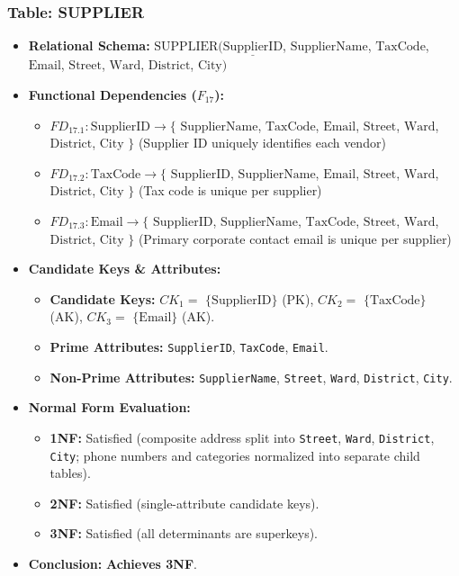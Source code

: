 \documentclass[a4paper,12pt]{report}
\begin{document}
\subsubsection{Table: SUPPLIER}\label{table-supplier}

\begin{itemize}
\item
  \textbf{Relational Schema:} \(\text{SUPPLIER}(\underline{\text{SupplierID}}\), \(\text{SupplierName}\), \(\text{TaxCode}\), \(\text{Email}\), \(\text{Street}\), \(\text{Ward}\), \(\text{District}\), \(\text{City})\)
\item
  \textbf{Functional Dependencies (\(F_{17}\)):}

  \begin{itemize}
  \item
    \(FD_{17.1}: \text{SupplierID} \rightarrow \{\) \(\text{SupplierName}\), \(\text{TaxCode}\), \(\text{Email}\), \(\text{Street}\), \(\text{Ward}\), \(\text{District}\), \(\text{City}\) \(\}\) (Supplier ID uniquely identifies each vendor)
  \item
    \(FD_{17.2}: \text{TaxCode} \rightarrow \{\) \(\text{SupplierID}\), \(\text{SupplierName}\), \(\text{Email}\), \(\text{Street}\), \(\text{Ward}\), \(\text{District}\), \(\text{City}\) \(\}\) (Tax code is unique per supplier)
  \item
    \(FD_{17.3}: \text{Email} \rightarrow \{\) \(\text{SupplierID}\), \(\text{SupplierName}\), \(\text{TaxCode}\), \(\text{Street}\), \(\text{Ward}\), \(\text{District}\), \(\text{City}\) \(\}\) (Primary corporate contact email is unique per supplier)
  \end{itemize}
\item
  \textbf{Candidate Keys \& Attributes:}

  \begin{itemize}
  \item
    \textbf{Candidate Keys:} \(CK_{1} =\) \(\{\text{SupplierID}\}\) (PK), \(CK_{2} =\) \(\{\text{TaxCode}\}\) (AK), \(CK_{3} =\) \(\{\text{Email}\}\) (AK).
  \item
    \textbf{Prime Attributes:} \texttt{SupplierID}, \texttt{TaxCode}, \texttt{Email}.
  \item
    \textbf{Non-Prime Attributes:} \texttt{SupplierName}, \texttt{Street}, \texttt{Ward}, \texttt{District}, \texttt{City}.
  \end{itemize}
\item
  \textbf{Normal Form Evaluation:}

  \begin{itemize}
  \item
    \textbf{1NF:} Satisfied (composite address split into \texttt{Street}, \texttt{Ward}, \texttt{District}, \texttt{City}; phone numbers and categories normalized into separate child tables).
  \item
    \textbf{2NF:} Satisfied (single-attribute candidate keys).
  \item
    \textbf{3NF:} Satisfied (all determinants are superkeys).
  \end{itemize}
\item
  \textbf{Conclusion:} \textbf{Achieves 3NF}.
\end{itemize}
\end{document}
